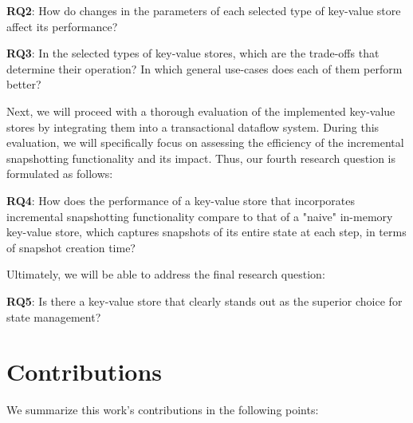 \begin{tcolorbox}
    \textbf{RQ2}: How do changes in the parameters of each selected type of key-value store affect its performance?
\end{tcolorbox}
\vspace{8px}

\begin{tcolorbox}
    \textbf{RQ3}: In the selected types of key-value stores, which are the trade-offs that determine their operation? In which general use-cases does each of them perform better?
\end{tcolorbox}
\vspace{8px}

Next, we will proceed with a thorough evaluation of the implemented key-value stores by integrating them into a transactional dataflow system. During this evaluation, we will specifically focus on assessing the efficiency of the incremental snapshotting functionality and its impact. Thus, our fourth research question is formulated as follows:\\

\begin{tcolorbox}
    \textbf{RQ4}: How does the performance of a key-value store that incorporates incremental snapshotting functionality compare to that of a "naive" in-memory key-value store, which captures snapshots of its entire state at each step, in terms of snapshot creation time?
\end{tcolorbox}
\vspace{8px}

Ultimately, we will be able to address the final research question:\\

\begin{tcolorbox}
    \textbf{RQ5}: Is there a key-value store that clearly stands out as the superior choice for state management?
\end{tcolorbox}
\vspace{8px}

\section{Contributions}

We summarize this work's contributions in the following points:

